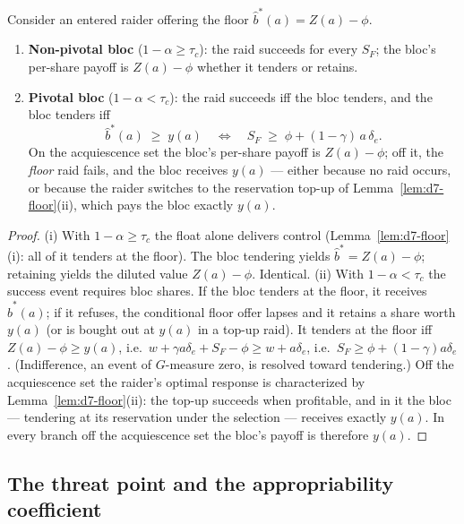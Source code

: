 \begin{lemma}
\label{lem:d7-bloc}
Consider an entered raider offering the floor $\hat b^{\ast}(a)=Z(a)-\phi$.
\begin{enumerate}
\item[\textup{(i)}] \textbf{Non-pivotal bloc} ($1-\alpha\ge\tau_{c}$): the raid succeeds for every $S_{F}$; the bloc's per-share payoff is $Z(a)-\phi$ whether it tenders or retains.
\item[\textup{(ii)}] \textbf{Pivotal bloc} ($1-\alpha<\tau_{c}$): the raid succeeds iff the bloc tenders, and the bloc tenders iff
\[
\hat b^{\ast}(a)\;\ge\;y(a)
\quad\Longleftrightarrow\quad
S_{F}\;\ge\;\phi+(1-\gamma)\,a\,\delta_{e}.
\]
On the acquiescence set the bloc's per-share payoff is $Z(a)-\phi$; off it, the \emph{floor} raid fails, and the bloc receives $y(a)$ --- either because no raid occurs, or because the raider switches to the reservation top-up of Lemma~\ref{lem:d7-floor}(ii), which pays the bloc exactly $y(a)$.
\end{enumerate}
\end{lemma}

\begin{proof}
(i) With $1-\alpha\ge\tau_{c}$ the float alone delivers control (Lemma~\ref{lem:d7-floor}(i): all of it tenders at the floor). The bloc tendering yields $\hat b^{\ast}=Z(a)-\phi$; retaining yields the diluted value $Z(a)-\phi$. Identical.
(ii) With $1-\alpha<\tau_{c}$ the success event requires bloc shares. If the bloc tenders at the floor, it receives $\hat b^{\ast}(a)$; if it refuses, the conditional floor offer lapses and it retains a share worth $y(a)$ (or is bought out at $y(a)$ in a top-up raid). It tenders at the floor iff $Z(a)-\phi\ge y(a)$, i.e.\ $w+\gamma a\delta_{e}+S_{F}-\phi\ge w+a\delta_{e}$, i.e.\ $S_{F}\ge\phi+(1-\gamma)a\delta_{e}$. (Indifference, an event of $G$-measure zero, is resolved toward tendering.) Off the acquiescence set the raider's optimal response is characterized by Lemma~\ref{lem:d7-floor}(ii): the top-up succeeds when profitable, and in it the bloc --- tendering at its reservation under the selection --- receives exactly $y(a)$. In every branch off the acquiescence set the bloc's payoff is therefore $y(a)$.
\end{proof}

\subsection{The threat point and the appropriability coefficient}

